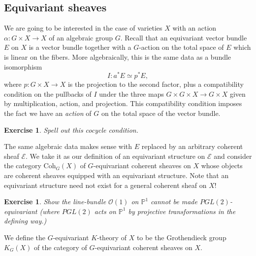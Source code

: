 \documentclass[11pt]{amsart}
\newtheorem{exercise}[dummy]{Exercise}
\theoremstyle{definition}
\newcommand{\Ec}{\mathcal{E}}
\newcommand{\Oc}{\mathcal{O}}
\newcommand{\Coh}{\mathrm{Coh}}
\numberwithin{equation}{subsection}
\numberwithin{figure}{subsection}
\begin{document}
\subsection{Equivariant sheaves}
We are going to be interested in the case of varieties $X$ with an action $\alpha:G\times X\rightarrow X$ of an algebraic group $G$. Recall that an equivariant vector bundle $E$ on $X$ is a vector bundle together with a $G$-action on the total space of $E$ which is linear on the fibers. More algebraically, this is the same data as a bundle isomorphism
$$
I\colon a^*E\simeq p^*E,
$$
where $p:G\times X\rightarrow X$ is the projection to the second factor,
plus a compatibility condition on the pullbacks of $I$ under the three maps $G\times G\times X\rightarrow G\times X$  given by multiplication, action, and projection. This compatibility condition imposes the fact we have an \emph{action} of $G$ on the total space of the vector bundle.
\begin{exercise}
Spell out this cocycle condition.
\end{exercise}
 The same algebraic data makes sense with $E$ replaced by an arbitrary coherent sheaf $\Ec$. We take it as our definition of an equivariant structure on $\Ec$ and consider the category $\Coh_G(X)$ of $G$-equivariant coherent sheaves on $X$ whose objects are coherent sheaves equipped with an equivariant structure. Note that an equivariant structure need not exist for a general coherent sheaf on $X$! 
 
 \begin{exercise}
 Show the line-bundle $\Oc(1)$ on $\mathbb{P}^1$ cannot be made $PGL(2)$-equivariant (where $PGL(2)$ acts on $\mathbb{P}^1$ by projective transformations in the defining way.)
 \end{exercise}

We define the $G$-equivariant $K$-theory of $X$ to be the Grothendieck group $K_G(X)$ of the category of $G$-equivariant coherent sheaves on $X$.
\end{document}
